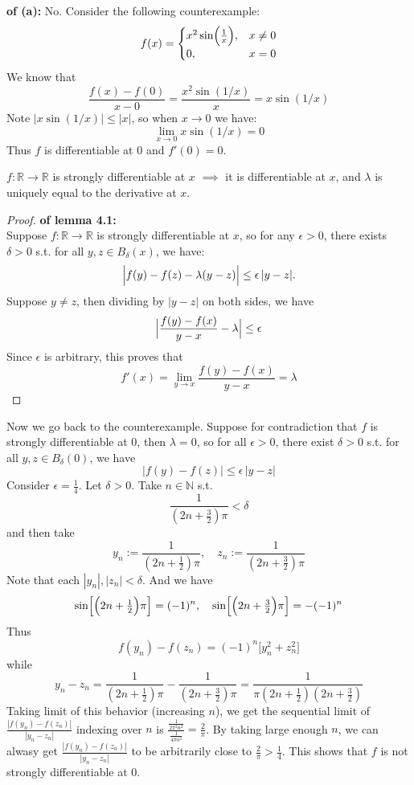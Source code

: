 \documentclass[lang=cn,11pt]{elegantbook}
\begin{document}
\begin{solution}
    \textbf{of (a):} No. Consider the following counterexample: \\
\[
f(x)=
\begin{cases}
x^2\sin\Bigl(\frac{1}{x}\Bigr), & x\neq 0\\
0, & x=0
\end{cases}
\]
We know that
\[
\frac{f(x)-f(0)}{x-0} = \frac{x^2\sin(1/x)}{x} = x\sin(1/x)
\]
Note \(|x\sin(1/x)|\le |x|\), so when \( x\to 0 \) we have:
\[
\lim_{x\to 0} x\sin(1/x) = 0
\]
Thus $f$ is differentiable at $0$ and \( f'(0)=0 \).

\begin{lemma}
 $f:\mathbb{R} \rightarrow \mathbb{ R}$ is strongly differentiable at $x$ $\implies$ it is differentiable at $x$, and $\lambda$ is uniquely equal to the derivative at $x$.
\end{lemma}
\begin{proof}
    \textbf{of lemma 4.1:}\\
   Suppose $f:\mathbb{R} \rightarrow \mathbb{ R}$ is strongly differentiable at $x$, so for any \(\epsilon>0\), there exists \(\delta>0\) s.t. for all $y,z\in B_\delta (x)$, we have: \[
\Bigl|f(y)-f(z)-\lambda(y-z)\Bigr|\le \epsilon\,|y-z|.
\]
Suppose $y\not = z$, then dividing by \(|y-z|\) on both sides, we have
\[
\Bigl|\frac{f(y)-f(x)}{y-x}-\lambda\Bigr|\le \epsilon
\]
Since $\epsilon$ is arbitrary, this proves that 
\[
f'(x) = \lim_{y\to x}\frac{f(y)-f(x)}{y-x}=\lambda  
\]
\end{proof}

Now we go back to the counterexample. Suppose for contradiction that $f$ is strongly differentiable at $0$, then $\lambda = 0$, so for all \(\epsilon>0\), there exist \(\delta>0\) s.t. for all $y,z \in B_\delta(0)$, we have
\[
|f(y)-f(z)| \le \epsilon\,|y-z|
\]
Consider \(\epsilon=\tfrac{1}{4}\). Let $\delta > 0$. Take $n\in\mathbb{N}$ s.t.
\[
\frac{1}{(2n+\tfrac{3}{2})\pi} < \delta
\]and then take
\[
y_n:= \frac{1}{\left(2n+\tfrac{1}{2}\right)\pi},\quad
z_n:= \frac{1}{\left(2n+\tfrac{3}{2}\right)\pi}
\]Note that each $|y_n|,|z_n| < \delta$. And we have \[
   \sin\Bigl[\Bigl(2n+\tfrac{1}{2}\Bigr)\pi\Bigr]=(-1)^n,\quad
   \sin\Bigl[\Bigl(2n+\tfrac{3}{2}\Bigr)\pi\Bigr]= -(-1)^n
   \]Thus \[
   f(y_n)-f(z_n)= (-1)^n\bigl[y_n^2+z_n^2\bigr]
   \]while 
\[
y_n-z_n = \frac{1}{\left(2n+\tfrac{1}{2}\right)\pi} - \frac{1}{\left(2n+\tfrac{3}{2}\right)\pi}
=\frac{1}{\pi\left(2n+\tfrac{1}{2}\right)\left(2n+\tfrac{3}{2}\right)}
\]
Taking limit of this behavior (increasing $n$), we get the sequential limit of \(\frac{|f(y_n)-f(z_n)|}{|y_n-z_n|} \) indexing over $n$ is $\frac{\frac{1}{2\pi^2 n^2}}{\frac{1}{4\pi n^2}} = \frac{2}{\pi}$.
By taking large enough $n$, we can alwasy get \(\frac{|f(y_n)-f(z_n)|}{|y_n-z_n|} \) to be arbitrarily close to \( \frac{2}{\pi}> \frac{1}{4}\).
This shows that $f$ is not strongly differentiable at $0$.
\end{solution}
\end{document}

